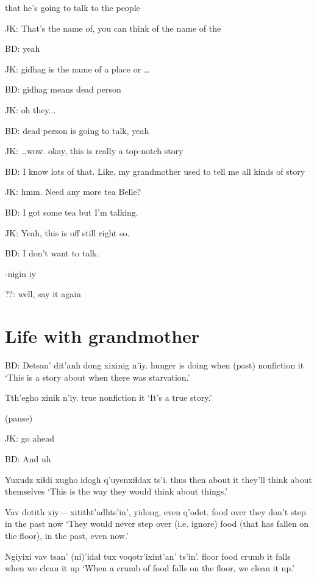 \documentclass[12pt]{article}
\begin{document}
that he's going to talk to the people

JK:  That's the name of, you can think of the name of the

BD:  yeah

JK:  gidhag is the name of a place or \ldots

BD:  gidhag means dead person

JK:  oh they...

BD:  dead person is going to talk, yeah

JK:  \ldots wow. okay, this is really a top-notch story

BD:  I know lots of that. Like, my grandmother used to tell me all kinds of story

JK:  hmm. Need any more tea Belle?

BD:  I got some tea but I'm talking.  

JK:  Yeah, this is off still right so. 

BD:  I don't want to talk. 

-nigin iy

??:  well, say it again

\section*{Life with grandmother}

BD:  
\gll Detsan' dit'anh   dong    xixinig n'iy. 
hunger  {is doing} {when (past)} nonfiction it
\glt `This is a story about when there was starvation.'
\glend

\gll Tth'egho xinik n'iy.
true     nonfiction it
\glt `It's a true story.'
\glend

(pause)

JK:  go ahead

BD:  And uh

\gll Yuxudz  xiɬdi xugho    {idogh q'uyenxiɬdax ts'i.} 
thus     then  {about it} {they'll think about themselves}
\glt `This is the way they would think about things.'
\glend

\gll Vav  dotith xiy--- {xititht'adhts'in',} yidong, even q'odet.
food over  {} {they don't step}     {in the past} {}     now
\glt `They would never step over (i.e. ignore) food (that has fallen on the floor), in the past, even now.'
\glend

\gll Ngiyixi  vav  tsan' (ni)'idaɬ tux  voqotr'ixint'an' ts'in'. 
floor food crumb {it falls} when {we clean it up}
\glt `When a crumb of food falls on the floor, we clean it up.'
\glend
\end{document}

